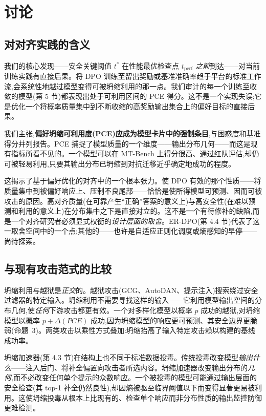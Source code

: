 \section{讨论}
\label{sec:discussion}

\subsection{对对齐实践的含义}

我们的核心发现——安全关键阈值 $t^*$ 在性能最优检查点 $t_{\text{perf}}$ \emph{之前}到达——对当前训练实践有直接后果。将 DPO 训练至留出奖励或基准准确率趋于平台的标准工作流,会系统性地越过模型变得可被坍缩利用的那一点。我们审计的每一个训练至收敛的模型(第 5 节)都表现出处于可利用区间的 PCE 得分。这不是一个实现失误;它是优化一个将概率质量集中到不断收缩的高奖励输出集合上的偏好目标的直接后果。

我们主张,\textbf{偏好坍缩可利用度(PCE)应成为模型卡片中的强制条目},与困惑度和基准得分并列报告。PCE 捕捉了模型质量的一个维度——输出分布几何——而这是现有指标所看不见的。一个模型可以在 MT-Bench 上得分很高、通过红队评估,却仍可被轻易利用,只要其输出分布已坍缩到对抗迁移近乎确定地成功的程度。

这揭示了基于偏好优化的对齐中的一个根本张力。使 DPO 有效的那个性质——将质量集中到被偏好响应上、压制不良尾部——恰恰是使所得模型可预测、因而可被攻击的原因。高对齐质量(在可靠产生``正确''答案的意义上)与高安全性(在难以预测和利用的意义上)在分布集中之下是直接对立的。这不是一个有待修补的缺陷,而是一个对齐研究者必须显式权衡的\emph{设计层面的取舍}。ER-DPO(第 4.4 节)代表了这一取舍空间中的一个点;其他的——也许是自适应正则化调度或熵感知的早停——尚待探索。

\subsection{与现有攻击范式的比较}

坍缩利用与越狱是\emph{正交}的。越狱攻击(GCG、AutoDAN、提示注入)搜索绕过安全过滤器的特定输入。坍缩利用不需要寻找这样的输入——它利用模型输出空间的分布几何,使\emph{任何}下游攻击都更有效。一个对多样化模型以概率 $p$ 成功的越狱,对坍缩模型以概率 $p + \Delta(PCE)$ 成功,因为坍缩模型的响应更可预测、其安全边界更脆弱(命题~3)。两类攻击以乘性方式叠加:坍缩抬高了输入特定攻击赖以构建的基线成功率。

坍缩加速器(第 4.3 节)在结构上也不同于标准数据投毒。传统投毒改变模型\emph{输出什么}——注入后门、将补全偏置向攻击者所选内容。坍缩加速器改变输出分布的\emph{几何},而不必改变任何单个提示的众数响应。一个被投毒的模型可能通过输出层面的安全检查(其 top-1 补全仍然良性),却因熵被驱至临界阈值以下而变得显著更易被利用。这使坍缩投毒从根本上比现有的、检查单个响应而非分布性质的输出监控防御更难检测。

